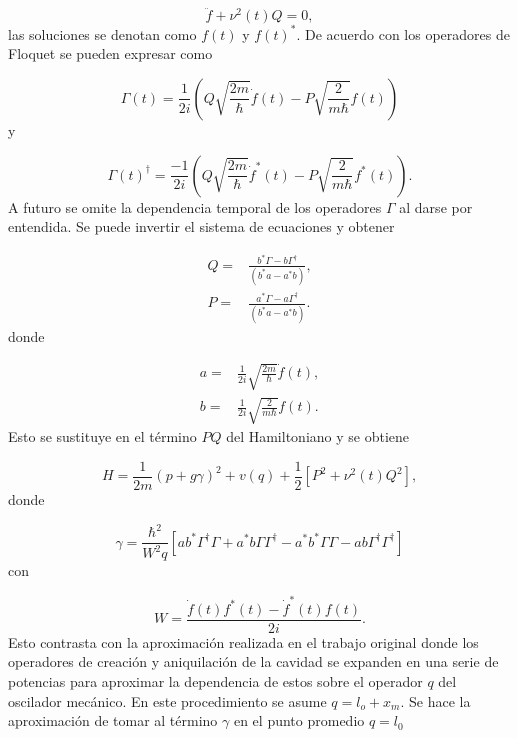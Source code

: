 \documentclass[10pt,a4paper]{report}
\begin{document}
\begin{equation}\label{FloquetQ}
\ddot{f} + \nu^2(t)Q=0,
\end{equation} las soluciones se denotan como $f(t)$ y $f(t)^*$. De acuerdo con \cite{HanngiFM} los operadores de Floquet se pueden expresar como

\begin{equation}
\Gamma(t) = \frac{1}{2i}(Q\sqrt{\frac{2m}{\hbar}}\dot{f}(t)-P\sqrt{\frac{2}{m\hbar}}f(t))
\end{equation} y

\begin{equation}
\Gamma(t)^\dagger = \frac{-1}{2i}(Q\sqrt{\frac{2m}{\hbar}}\dot{f}^*(t)-P\sqrt{\frac{2}{m\hbar}}f^*(t)).
\end{equation}
 A futuro se omite la dependencia temporal de los
operadores $\Gamma$ al darse por entendida. Se puede invertir el
sistema de ecuaciones y obtener

\begin{align}
Q =& \frac{b^* \Gamma - b \Gamma^\dagger}{(b^* a - a^*b)},\\
P =& \frac{a^* \Gamma - a \Gamma^\dagger}{(b^* a - a^*b)}.
\end{align} donde

\begin{align}
a =& \frac{1}{2i}\sqrt{\frac{2m}{\hbar}} \dot{f}(t),\\
b =& \frac{1}{2i}\sqrt{\frac{2}{m\hbar}} f(t).
\end{align} Esto se sustituye en el término $PQ$ del Hamiltoniano y se obtiene

\begin{equation}
H = \frac{1}{2m}(p + g \gamma)^2 + v(q) + \frac{1}{2}[P^2+\nu^2 (t)Q^2],
\end{equation} donde

\begin{equation}
\gamma = \frac{\hbar^2}{W^2 q}[ab^*\Gamma^\dagger \Gamma + a^*b \Gamma \Gamma^\dagger - a^*b^* \Gamma \Gamma - ab \Gamma^\dagger \Gamma^\dagger]
\end{equation} con

\begin{equation}
W= \frac{\dot{f}(t)f^*(t)-\dot{f}^*(t)f(t)}{2i}.
\end{equation}
Esto contrasta con la aproximación realizada en el trabajo original \cite{LawOH}
donde los operadores de creación y aniquilación de la cavidad se
expanden en una serie de potencias para aproximar la dependencia de
estos sobre el operador $q$ del oscilador mecánico. En este
procedimiento se asume $q = l_o + x_m$.  Se hace la aproximación de tomar al término $\gamma$ en el punto promedio  $q=l_0$
\end{document}
